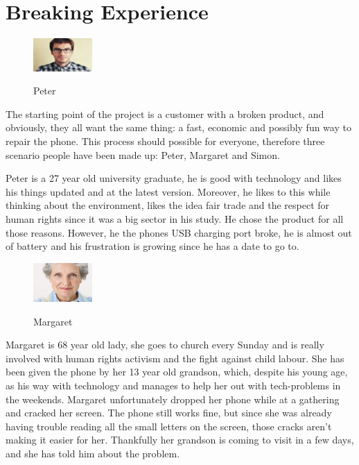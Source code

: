 \documentclass[final,a4paper]{report} %
\begin{document}
\chapter{Breaking Experience}
\label{ch:breaking-experience}
\begin{figure}
	\centering
	\includegraphics[width=0.2\textwidth]{resources/Peter.jpg}
	\label{fig:Peter}
	\caption{Peter}
\end{figure}
The starting point of the project is a customer with a broken product, and obviously, they all want the same thing: a fast, economic and possibly fun way to repair the phone. This process should possible for everyone, therefore three scenario people have been made up: Peter, Margaret and Simon.

Peter is a 27 year old university graduate, he is good with technology and likes his things updated and at the latest version. Moreover, he likes to this while thinking about the environment, likes the idea fair trade and the respect for human rights since it was a big sector in his study. He chose the product for all those reasons. However, he the phones USB charging port broke, he is almost out of battery and his frustration is growing since he has a date to go to. 

\begin{figure}
	\centering
	\includegraphics[width=0.2\textwidth]{resources/Margaret.jpg}
	\label{fig:Margaret}
	\caption{Margaret}
\end{figure}

Margaret is 68 year old lady, she goes to church every Sunday and is really involved with human rights activism and the fight against child labour. She has been given the phone by her 13 year old grandson, which, despite his young age, as his way with technology and manages to help her out with tech-problems in the weekends. Margaret unfortunately dropped her phone while at a gathering and cracked her screen. The phone still works fine, but since she was already having trouble reading all the small letters on the screen, those cracks aren't making it easier for her. Thankfully her grandson is coming to visit in a few days, and she has told him about the problem.
\end{document}
